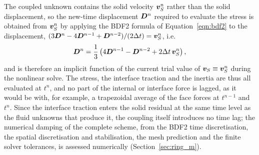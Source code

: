 The coupled unknown contains the solid velocity $\boldsymbol{v}_S^n$ rather than the solid displacement, so the new-time displacement $\boldsymbol{D}^{n}$ required to evaluate the stress is obtained from $\boldsymbol{v}_S^n$ by applying the BDF2 formula of Equation~\eqref{eqn:bdf2} to the displacement, $(3\boldsymbol{D}^{n} - 4\boldsymbol{D}^{n-1} + \boldsymbol{D}^{n-2})/(2\Delta t) = \boldsymbol{v}_S^n$, i.e.
\begin{equation}
    \boldsymbol{D}^{n}
    =
    \frac{1}{3}
    \left(
    4\boldsymbol{D}^{n-1}
    -
    \boldsymbol{D}^{n-2}
    +
    2\Delta t\, \boldsymbol{v}_S^n
    \right),
    \label{eqn:solid_bdf2_displacement}
\end{equation}
and is therefore an implicit function of the current trial value of $\boldsymbol{v}_S \equiv \boldsymbol{v}_S^n$ during the nonlinear solve.
The stress, the interface traction and the inertia are thus all evaluated at $t^n$, and no part of the internal or interface force is lagged, as it would be with, for example, a trapezoidal average of the face forces at $t^{n-1}$ and $t^n$.
Since the interface traction enters the solid residual at the same time level as the fluid unknowns that produce it, the coupling itself introduces no time lag; the numerical damping of the complete scheme, from the BDF2 time discretisation, the spatial discretisation and stabilisation, the mesh prediction and the finite solver tolerances, is assessed numerically (Section~\ref{sec:ring_m}).

